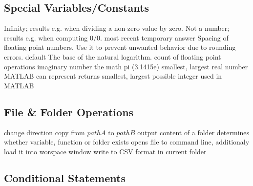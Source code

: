 \subsection{Special Variables/Constants}{}
	{Infinity; results e.g. when dividing a non-zero value by zero.}
	{Not a number; results e.g. when computing $0/0$.}
	{most recent temporary answer}
	{Spacing of floating point numbers. Use it to prevent unwanted behavior due to rounding errors.}
	{default}
	{The base of the natural logarithm.}
	{count of floating point operations}
	{imaginary number}
	{the math pi (3.1415e)}
	{smallest, largest real number MATLAB can represent}
	{returns smallest, largest possible integer used in MATLAB}

\subsection{File \& Folder Operations}{}
	{change direction}
	{copy from $pathA$ to $pathB$}
	{output content of a folder}
	{determines whether variable, function or folder exists}
	{opens file to command
    line, additionaly load it into worspace window}
	{write to CSV format in current folder}

\subsection{Conditional Statements}{}



